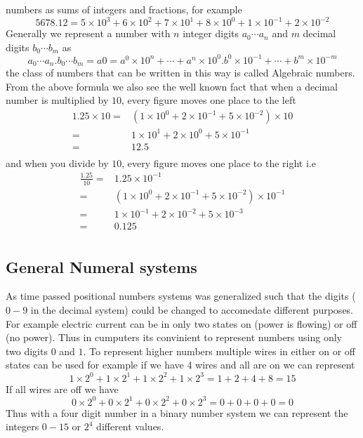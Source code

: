 numbers as sums of integers and fractions, for example
\[
5678.12 = 5 \times 10^3 + 6 \times 10^2 + 7 \times 10^1 + 8 \times 10^0 + 1 \times
10^{-1} + 2 \times 10^{-2}
\]
Generally we represent a number with $n$ integer digits $a_0 \cdots a_n$ and $m$ decimal digits $b_0 \cdots b_m$ as
\[
a_0 \cdots a_n.b_0 \cdots b_m = a0 = a^0 \times 10^n + \cdots + a^n \times 10^0 . b^0 \times 10^{-1} + \cdots + b^m \times 10^{-m}
\]
the class of numbers that can be written in this way is called {Algebraic numbers}. From the above formula we also see the well known fact that when a decimal number is multiplied by $10$, every figure moves one place to the left
\begin{align*}
1.25 \times 10 =& (1 \times 10^0 + 2 \times 10^{-1} + 5 \times 10^{-2}) \times 10 \\
               =& 1 \times 10^1 + 2 \times 10^0 + 5 \times 10^{-1}                \\
               =& 12.5                                                            \\
\end{align*}
and when you divide by $10$, every figure moves one place to the right i.e
\begin{align*}
\frac{1.25}{10} =& 1.25 \times 10^{-1}                                                  \\
                =& (1 \times 10^0 + 2 \times 10^{-1} + 5 \times 10^{-2}) \times 10^{-1} \\
                =& 1 \times 10^{-1} + 2 \times 10^{-2} + 5 \times 10^{-3}               \\
                =& 0.125                                                                \\
\end{align*}

\subsection{General Numeral systems}
As time passed positional numbers systems was generalized such that the digits ($0-9$ in the decimal system) could be changed to accomedate different purposes. For example electric current can be in only two states on (power is flowing) or off (no power). Thus in cumputers its convinient to represent numbers using only two digits $0$ and $1$. To represent higher numbers multiple wires in either on or off states can be used for example if we have $4$ wires and all are on we can represent
\[
  1 \times 2^0 + 1 \times 2^1 + 1 \times 2^2 + 1 \times 2^3 = 1 + 2 + 4 + 8 = 15
\]
If all wires are off we have
\[
  0 \times 2^0 + 0 \times 2^1 + 0 \times 2^2 + 0 \times 2^3 = 0 + 0 + 0 + 0 = 0
\]
Thus with a four digit number in a binary number system we can represent the integers $0-15$ or $2^4$ different values. 

